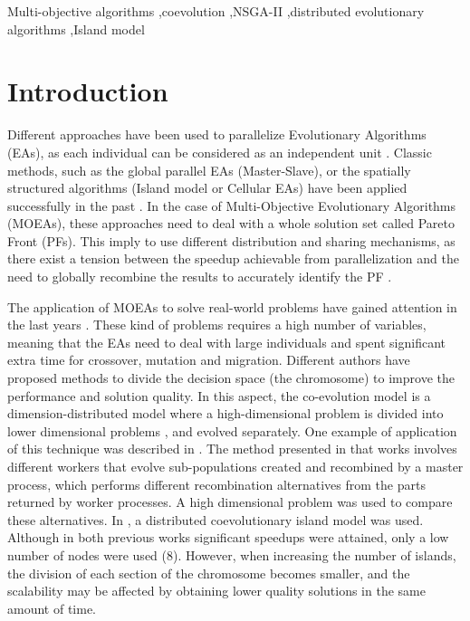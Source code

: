 \documentclass[preprint]{elsarticle}
\begin{document}
\begin{frontmatter}
\begin{keyword}
Multi-objective algorithms \sep coevolution \sep NSGA-II  \sep distributed evolutionary algorithms \sep Island model
\end{keyword}

\end{frontmatter}





\section{Introduction}

Different approaches have been used to parallelize Evolutionary Algorithms (EAs), as each individual can be considered as an independent unit \citep{Alba13parallel}. Classic methods, such as the global parallel EAs (Master-Slave), or the spatially structured algorithms (Island model or Cellular EAs) have been applied successfully in the past \citep{Folino03cellular,Alba02Parallelism}.  In the case of Multi-Objective Evolutionary Algorithms (MOEAs), these approaches \citep{Luna15Survey} need to deal with a whole solution set called Pareto Front (PFs). This imply to use different distribution and sharing mechanisms, as there exist a tension between the speedup achievable from parallelization and the need to globally recombine the results to accurately identify the PF \citep{Branke04Parallelizingcone}.


The application of MOEAs to solve real-world problems have gained attention in the last years \citep{Luna15Survey,Mukhopadhyay14Survey,Chavez15MO,Hidalgo16residualstress}. These kind of problems requires a high number of variables, meaning that the EAs need to deal with large individuals and spent significant extra time for crossover, mutation and migration. Different authors have proposed methods to divide the decision space (the chromosome) to improve the performance and solution quality. In this aspect, the co-evolution model is a dimension-distributed model where a high-dimensional problem is divided into lower dimensional problems \citep{Gong15models,Tonda12cooperative}, and evolved separately. One example of application of this technique was described in \citep{Kimovski15Parallel}. The method presented in that works involves different workers that evolve sub-populations created and recombined by a master process, which performs different recombination alternatives from the parts returned by worker processes. A high dimensional problem was used to compare these
alternatives. In \citep{Dorronsoro13superlinear}, a distributed coevolutionary island model was used.  Although in both previous works significant speedups were attained, only a low number of nodes were used (8). However, when increasing the number of islands, the division of each section of the chromosome becomes smaller, and the scalability may be affected by obtaining lower quality solutions in the same amount of time.
\end{document}
